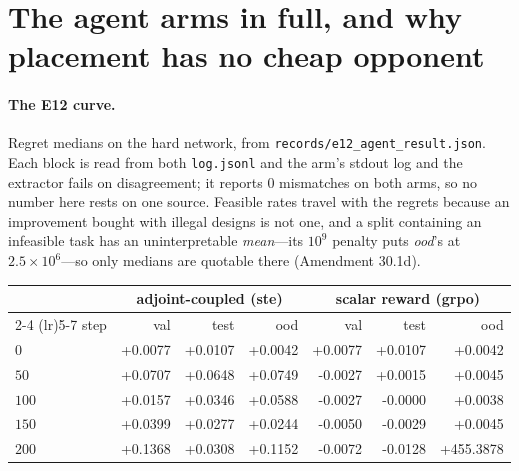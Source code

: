 \documentclass{article}
\begin{document}
\section{The agent arms in full, and why placement has no cheap opponent}
\label{app:agent}

\paragraph{The E12 curve.}  Regret medians on the hard network, from
\texttt{records/e12\_agent\_result.json}.  Each block is read from both \texttt{log.jsonl} and the
arm's stdout log and the extractor fails on disagreement; it reports $0$ mismatches on both arms,
so no number here rests on one source.  Feasible rates travel with the regrets because an
improvement bought with illegal designs is not one, and a split containing an infeasible task has
an uninterpretable \emph{mean}---its $10^9$ penalty puts \emph{ood}'s at $2.5\times10^6$---so only
medians are quotable there (Amendment 30.1d).

\begin{center}
\begin{tabular}{lrrrrrr}
\toprule
& \multicolumn{3}{c}{adjoint-coupled (ste)} & \multicolumn{3}{c}{scalar reward (grpo)} \\
\cmidrule(lr){2-4} \cmidrule(lr){5-7}
step & val & test & ood & val & test & ood \\
\midrule
$0$ & +0.0077 & +0.0107 & +0.0042 & +0.0077 & +0.0107 & +0.0042 \\
$50$ & +0.0707 & +0.0648 & +0.0749 & -0.0027 & +0.0015 & +0.0045 \\
$100$ & +0.0157 & +0.0346 & +0.0588 & -0.0027 & -0.0000 & +0.0038 \\
$150$ & +0.0399 & +0.0277 & +0.0244 & -0.0050 & -0.0029 & +0.0045 \\
$200$ & +0.1368 & +0.0308 & +0.1152 & -0.0072 & -0.0128 & +455.3878 \\
\bottomrule
\end{tabular}
\end{center}
\end{document}
